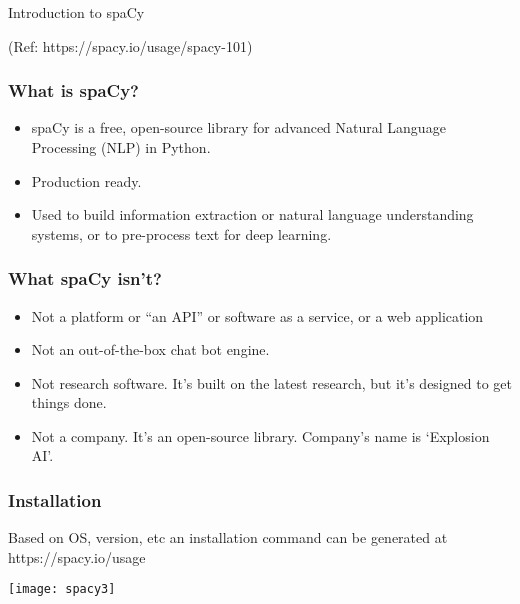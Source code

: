 \begin{frame}[fragile]\frametitle{}

\begin{center}
{\Large Introduction to spaCy}

{\tiny (Ref: https://spacy.io/usage/spacy-101)}

\end{center}


\end{frame}
%

\begin{frame}[fragile]\frametitle{What is spaCy?}
  \begin{itemize}
    \item spaCy is a free, open-source library for advanced Natural Language Processing (NLP) in Python.
		\item Production ready.
		\item Used to build information extraction or natural language understanding systems, or to pre-process text for deep learning.
  \end{itemize}
	
\end{frame}



\begin{frame}[fragile]\frametitle{What spaCy isn't?}
  \begin{itemize}
    \item Not a platform or “an API” or software as a service, or a web application
		\item Not an out-of-the-box chat bot engine.
		\item Not research software.  It’s built on the latest research, but it’s designed to get things done.
		\item Not a company. It’s an open-source library. Company's name is `Explosion AI'.
  \end{itemize}
	
\end{frame}

\begin{frame}[fragile]\frametitle{Installation}
Based on OS, version, etc an installation command can be generated at https://spacy.io/usage

	
\begin{center}
\texttt{[image: spacy3]}
\end{center}

\end{frame}

